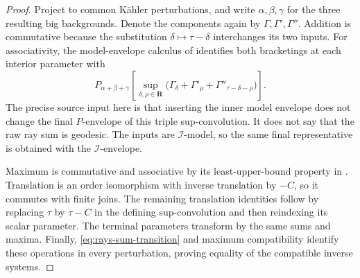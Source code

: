 \begin{proof}
Project to common K\"ahler perturbations, and write
$\alpha,\beta,\gamma$ for the three resulting big backgrounds.
Denote the components again by $\Gamma,\Gamma',\Gamma''$.
Addition is commutative because the substitution
$\delta\mapsto\tau-\delta$ interchanges its two inputs.
For associativity, the model-envelope calculus of
\cite[Proposition~9.4.1]{XiaBook} identifies both bracketings at
each interior parameter with
\[
 P_{\alpha+\beta+\gamma}
 \left[\sup_{\delta,\rho\in\mathbf R}
    \bigl(\Gamma_\delta+\Gamma'_\rho+
                 \Gamma''_{\tau-\delta-\rho}\bigr)\right].
\]
The precise source input here is that inserting the inner model
envelope does not change the final $P$-envelope of this triple
sup-convolution. It does not say that the raw ray sum is geodesic.
The inputs are $\mathcal I$-model, so the same final representative
is obtained with the $\mathcal I$-envelope.

Maximum is commutative and associative by its least-upper-bound
property in .
Translation is an order isomorphism with inverse translation by
$-C$, so it commutes with finite joins.
The remaining translation identities follow by replacing
$\tau$ by $\tau-C$ in the defining sup-convolution and then
reindexing its scalar parameter.
The terminal parameters transform by the same sums and maxima.
Finally, \eqref{eq:rays-sum-transition} and maximum compatibility
identify these operations in every perturbation, proving equality
of the compatible inverse systems.
\end{proof}


